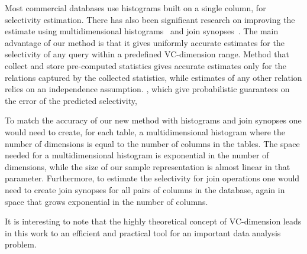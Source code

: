 Most commercial databases use histograms built on a single column, for selectivity
estimation. There has also been significant research on improving the estimate
using multidimensional
histograms~\citep{BrunoCG01,PoosalaI97,SrivastavaHMKT,WangS03} and join
synopses~\citep{AcharyaGPR99}. The main advantage of our method is that it gives
uniformly accurate estimates for the selectivity of any query within a predefined
VC-dimension range. Method that collect and store pre-computed statistics gives
accurate estimates only for the relations captured by the collected statistics,
while estimates of any other relation relies on an independence assumption.
, which give probabilistic guarantees on the error of the predicted
selectivity,%

To match the accuracy of our new method with histograms and  join synopses
one would need to create, for each table, a multidimensional histogram where the
number of dimensions is equal to the number of columns in the tables. The space
needed for a multidimensional histogram is exponential in the number of
dimensions, while the size of our sample representation is almost linear in that parameter. 
Furthermore, to estimate the selectivity for join operations
one would need to create join synopses for all pairs of columns in the database,
again in space that grows exponential in the number of columns.

It is interesting to note that the highly theoretical concept of VC-dimension
leads in this work to an efficient and practical tool for an important data
analysis problem.

